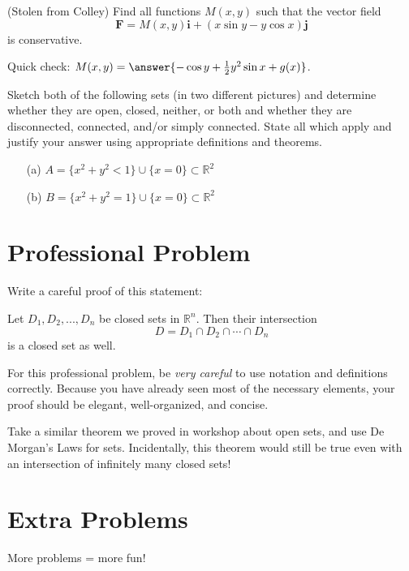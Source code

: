 \documentclass{ximera}
\begin{document}
\begin{problem}
(Stolen from Colley) Find all functions $M(x,y)$ such that the vector field
\[
\mathbf{F}=M(x,y)\mathbf{i}+(x\sin y-y\cos x)\mathbf{j}
\]
is conservative.

Quick check: $M(x,y) = \answer{-\cos y + \frac{1}{2} y^2\sin{x} + g(x)}$.
\end{problem}

\begin{problem}
Sketch both of the following sets (in two different pictures) and determine whether they are open, closed, neither, or both and whether they are disconnected, connected, and/or simply connected. State all which apply and justify your answer using appropriate definitions and theorems.
\begin{enumerate}
\item[(a)] $A=\{x^2+y^2<1\}\cup\{x=0\}\subset\mathbb{R}^2$
\item[(b)] $B=\{x^2+y^2=1\}\cup\{x=0\}\subset\mathbb{R}^2$
\end{enumerate}
\end{problem}

\section{Professional Problem}

\begin{problem}
Write a careful proof of this statement:

\begin{theorem}
Let $D_1,D_2,...,D_n$ be closed sets in $\mathbb{R}^n$. Then their intersection
\[
D=D_1\cap D_2\cap\cdots\cap D_n
\]
is a closed set as well.
\end{theorem}

For this professional problem, be \emph{very careful} to use notation and definitions correctly. Because you have already seen most of the necessary elements, your proof should be elegant, well-organized, and concise.

\begin{hint}
Take a similar theorem we proved in workshop about open sets, and use De Morgan's Laws for sets. Incidentally, this theorem would still be true even with an intersection of infinitely many closed sets!
\end{hint}
\end{problem}

\section{Extra Problems}

\begin{problem}
More problems = more fun!
\end{problem}
\end{document}
